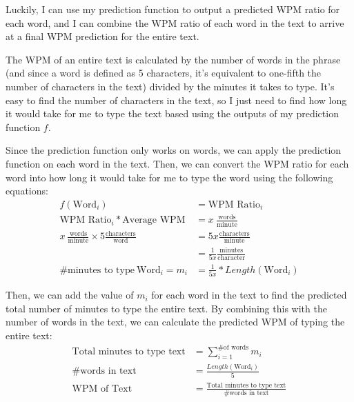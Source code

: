 \documentclass[12pt]{article}
\begin{document}
Luckily, I can use my prediction function to output a predicted WPM ratio for each word, and I can combine the WPM ratio of each word in the text to arrive at a final WPM prediction for the entire text.

The WPM of an entire text is calculated by the number of words in the phrase (and since a word is defined as 5 characters, it's equivalent to one-fifth the number of characters in the text) divided by the minutes it takes to type. It's easy to find the number of characters in the text, so I just need to find how long it would take for me to type the text based using the outputs of my prediction function $f$.

Since the prediction function only works on words, we can apply the prediction function on each word in the text. Then, we can convert the WPM ratio for each word into how long it would take for me to type the word using the following equations:
\begin{align*}
	f(\text{Word}_i)                                                                    & = \text{WPM Ratio}_i
	\\
	\text{WPM Ratio}_i * \text{Average WPM}                                             & = x~\frac{\text{words}}{\text{minute}}
	\\
	x~\frac{\text{words}}{\text{minute}} \times 5 \frac{\text{characters}}{\text{word}} & = 5x \frac{\text{characters}}{\text{minute}}
	\\
	                                                                                    & = \frac{1}{5x} \frac{\text{minutes}}{\text{character}}
	\\
	\text{\# minutes to type}~\text{Word}_i = m_i                                       & = \frac{1}{5x} * Length(\text{Word}_i)
\end{align*}

Then, we can add the value of $m_i$ for each word in the text to find the predicted total number of minutes to type the entire text. By combining this with the number of words in the text, we can calculate the predicted WPM of typing the entire text:
\begin{align*}
	\text{Total minutes to type text} & = \sum_{i=1}^{\text{\# of words}} m_i
	\\
	\text{\# words in text}           & = \frac{Length(\text{Word}_i)}{5}
	\\
	\text{WPM of Text}                & = \frac{\text{Total minutes to type text}}{\text{\# words in text}}
\end{align*}
\end{document}
